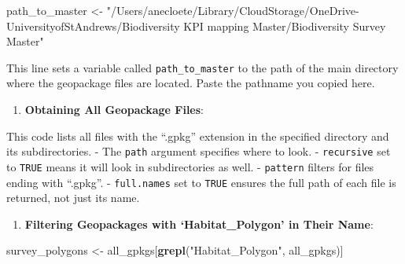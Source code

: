 \documentclass[
]{book}
\newenvironment{Shaded}{\begin{snugshade}}{\end{snugshade}}
\newcommand{\AttributeTok}[1]{\textcolor[rgb]{0.13,0.29,0.53}{#1}}
\newcommand{\ConstantTok}[1]{\textcolor[rgb]{0.56,0.35,0.01}{#1}}
\newcommand{\FunctionTok}[1]{\textcolor[rgb]{0.13,0.29,0.53}{\textbf{#1}}}
\newcommand{\NormalTok}[1]{#1}
\newcommand{\OtherTok}[1]{\textcolor[rgb]{0.56,0.35,0.01}{#1}}
\newcommand{\SpecialCharTok}[1]{\textcolor[rgb]{0.81,0.36,0.00}{\textbf{#1}}}
\newcommand{\StringTok}[1]{\textcolor[rgb]{0.31,0.60,0.02}{#1}}
\providecommand{\tightlist}{%
  \setlength{\itemsep}{0pt}\setlength{\parskip}{0pt}}
\theoremstyle{definition}
\theoremstyle{definition}
\theoremstyle{definition}
\theoremstyle{definition}
\theoremstyle{remark}
\begin{document}
\begin{Shaded}
\begin{Highlighting}[]
\NormalTok{   path\_to\_master }\OtherTok{\textless{}{-}} \StringTok{"/Users/anecloete/Library/CloudStorage/OneDrive{-}UniversityofStAndrews/Biodiversity KPI mapping Master/Biodiversity Survey Master"}
\end{Highlighting}
\end{Shaded}

This line sets a variable called \texttt{path\_to\_master} to the path of the main directory where the geopackage files are located. Paste the pathname you copied here.

\begin{enumerate}
\def\labelenumi{\arabic{enumi}.}
\setcounter{enumi}{1}
\tightlist
\item
  \textbf{Obtaining All Geopackage Files}:
\end{enumerate}

\begin{Shaded}
\end{Shaded}

This code lists all files with the ``.gpkg'' extension in the specified directory and its subdirectories.
- The \texttt{path} argument specifies where to look.
- \texttt{recursive} set to \texttt{TRUE} means it will look in subdirectories as well.
- \texttt{pattern} filters for files ending with ``.gpkg''.
- \texttt{full.names} set to \texttt{TRUE} ensures the full path of each file is returned, not just its name.

\begin{enumerate}
\def\labelenumi{\arabic{enumi}.}
\setcounter{enumi}{2}
\tightlist
\item
  \textbf{Filtering Geopackages with `Habitat\_Polygon' in Their Name}:
\end{enumerate}

\begin{Shaded}
\begin{Highlighting}[]
\NormalTok{   survey\_polygons }\OtherTok{\textless{}{-}}\NormalTok{ all\_gpkgs[}\FunctionTok{grepl}\NormalTok{(}\StringTok{"Habitat\_Polygon"}\NormalTok{, all\_gpkgs)]}
\end{Highlighting}
\end{Shaded}
\end{document}
